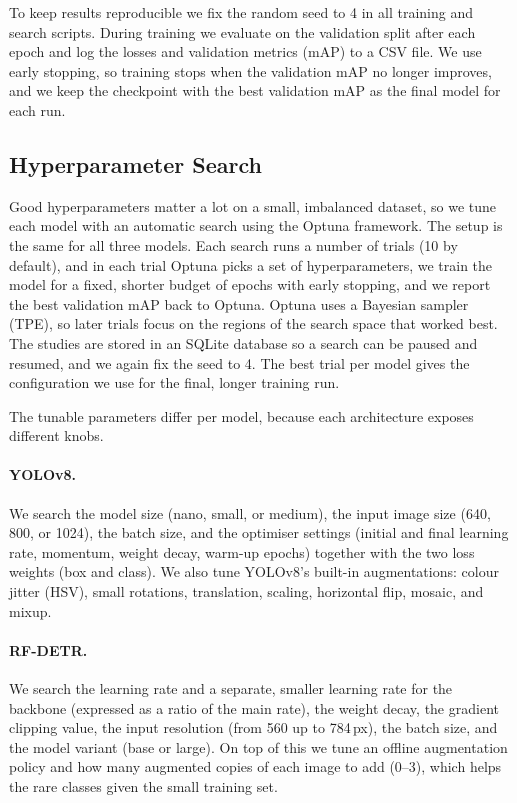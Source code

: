 \documentclass[11pt,a4paper]{article}
\begin{document}
To keep results reproducible we fix the random seed to 4 in all training and
search scripts. During training we evaluate on the validation split after each
epoch and log the losses and validation metrics (mAP) to a CSV file. We use
early stopping, so training stops when the validation mAP no longer improves, and
we keep the checkpoint with the best validation mAP as the final model for each
run.

\subsection{Hyperparameter Search}
\label{sec:hpo}
Good hyperparameters matter a lot on a small, imbalanced dataset, so we tune each
model with an automatic search using the Optuna framework. The setup is the same
for all three models. Each search runs a number of trials (10 by default), and in
each trial Optuna picks a set of hyperparameters, we train the model for a fixed,
shorter budget of epochs with early stopping, and we report the best validation
mAP back to Optuna. Optuna uses a Bayesian sampler (TPE), so later trials focus
on the regions of the search space that worked best. The studies are stored in an
SQLite database so a search can be paused and resumed, and we again fix the seed
to 4. The best trial per model gives the configuration we use for the final,
longer training run.

The tunable parameters differ per model, because each architecture exposes
different knobs.

\paragraph{YOLOv8.}
We search the model size (nano, small, or medium), the input image size
(640, 800, or 1024), the batch size, and the optimiser settings (initial and
final learning rate, momentum, weight decay, warm-up epochs) together with the
two loss weights (box and class). We also tune YOLOv8's built-in augmentations:
colour jitter (HSV), small rotations, translation, scaling, horizontal flip,
mosaic, and mixup.

\paragraph{RF-DETR.}
We search the learning rate and a separate, smaller learning rate for the
backbone (expressed as a ratio of the main rate), the weight decay, the gradient
clipping value, the input resolution (from 560 up to 784\,px), the batch size,
and the model variant (base or large). On top of this we tune an offline
augmentation policy and how many augmented copies of each image to add (0--3),
which helps the rare classes given the small training set.
\end{document}

